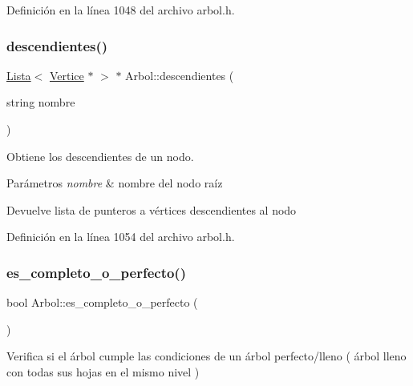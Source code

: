 Definición en la línea 1048 del archivo arbol.\+h.

\mbox{\label{classArbol_a790b07f284b14bd179499eb4a991ad86}} 
\subsubsection{\texorpdfstring{descendientes()}{descendientes()}\hspace{0.1cm}{\footnotesize\ttfamily [2/2]}}
{\footnotesize\ttfamily \hyperlink{classLista}{Lista}$<$ \hyperlink{classVertice}{Vertice} $\ast$ $>$ $\ast$ Arbol\+::descendientes (\begin{DoxyParamCaption}\item[{string}]{nombre }\end{DoxyParamCaption})}



Obtiene los descendientes de un nodo. 


\begin{DoxyParams}{Parámetros}
{\em nombre} & nombre del nodo raíz \\
\hline
\end{DoxyParams}
\begin{DoxyReturn}{Devuelve}
lista de punteros a vértices descendientes al nodo 
\end{DoxyReturn}


Definición en la línea 1054 del archivo arbol.\+h.

\mbox{\label{classArbol_a9e472df85f3bb1aa5c90f8157ad6ff22}} 
\subsubsection{\texorpdfstring{es\+\_\+completo\+\_\+o\+\_\+perfecto()}{es\_completo\_o\_perfecto()}}
{\footnotesize\ttfamily bool Arbol\+::es\+\_\+completo\+\_\+o\+\_\+perfecto (\begin{DoxyParamCaption}{ }\end{DoxyParamCaption})}



Verifica si el árbol cumple las condiciones de un árbol perfecto/lleno ( árbol lleno con todas sus hojas en el mismo nivel ) 

